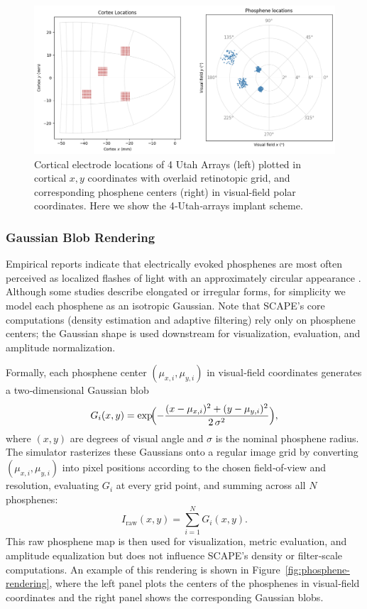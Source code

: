 \begin{figure}[h]
  \centering
  \includegraphics[width=0.9\columnwidth]{figures/cortextophosphenelocations4utaharrays.png}
  \caption{Cortical electrode locations of 4 Utah Arrays (left) plotted in cortical \(x,y\) coordinates with overlaid retinotopic grid, and corresponding phosphene centers (right) in visual‐field polar coordinates. Here we show the 4‐Utah‐arrays implant scheme.}
  \label{fig:cortex-phosphene-locations}
\end{figure}



\subsubsection{Gaussian Blob Rendering}
Empirical reports indicate that electrically evoked phosphenes are most often perceived as localized flashes of light with an approximately circular appearance \cite{vanderGrinten2024}. Although some studies describe elongated or irregular forms, for simplicity we model each phosphene as an isotropic Gaussian. Note that SCAPE’s core computations (density estimation and adaptive filtering) rely only on phosphene centers; the Gaussian shape is used downstream for visualization, evaluation, and amplitude normalization.

Formally, each phosphene center \((\mu_{x,i},\mu_{y,i})\) in visual‐field coordinates generates a two‐dimensional Gaussian blob
\[
G_i(x,y)
=
\exp\!\Bigl(-\frac{(x-\mu_{x,i})^2 + (y-\mu_{y,i})^2}{2\,\sigma^2}\Bigr),
\]
where \((x,y)\) are degrees of visual angle and \(\sigma\) is the nominal phosphene radius. The simulator rasterizes these Gaussians onto a regular image grid by converting \((\mu_{x,i},\mu_{y,i})\) into pixel positions according to the chosen field‐of‐view and resolution, evaluating \(G_i\) at every grid point, and summing across all \(N\) phosphenes:
\[
I_{\mathrm{raw}}(x,y)
=
\sum_{i=1}^{N} G_i(x,y).
\]
This raw phosphene map is then used for visualization, metric evaluation, and amplitude equalization but does not influence SCAPE’s density or filter‐scale computations. An example of this rendering is shown in Figure~\ref{fig:phosphene-rendering}, where the left panel plots the centers of the phosphenes in visual‐field coordinates and the right panel shows the corresponding Gaussian blobs.

